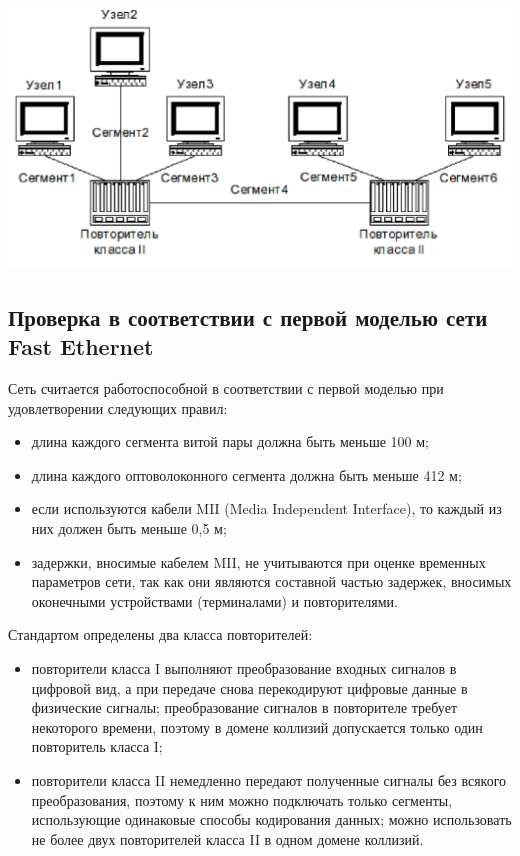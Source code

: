\begin{center}
    \centering
        \includegraphics[width=\textwidth]{../images/topology.png}
    \label{img:nettopology}
\end{center}

\subsection{Проверка в соответствии с первой моделью сети Fast Ethernet}
Сеть считается работоспособной в соответствии с первой моделью при удовлетворении
следующих правил:
\begin{itemize}
    \item длина каждого сегмента витой пары должна быть меньше 100 м;
    \item длина каждого оптоволоконного сегмента должна быть меньше 412 м;
    \item если используются кабели MII (Media Independent Interface), то каждый из
        них должен быть меньше 0,5 м;

    \item задержки, вносимые кабелем MII, не учитываются при оценке временных
        параметров сети, так как они являются составной частью задержек, вносимых
        оконечными устройствами (терминалами) и повторителями.
\end{itemize}
    Стандартом определены два класса повторителей:
\begin{itemize}
    \item повторители класса I выполняют преобразование входных сигналов в цифровой
        вид, а при передаче снова перекодируют цифровые данные в физические
        сигналы; преобразование сигналов в повторителе требует некоторого времени,
        поэтому в домене коллизий допускается только один повторитель класса I;

    \item повторители класса II немедленно передают полученные сигналы без всякого
        преобразования, поэтому к ним можно подключать только сегменты, использующие
        одинаковые способы кодирования данных; можно использовать не
        более двух повторителей класса II в одном домене коллизий.
\end{itemize}

